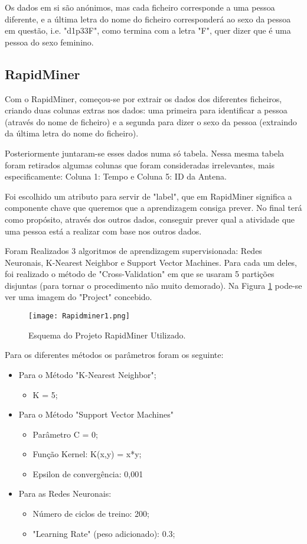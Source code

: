 \documentclass[conference]{IEEEtran}
\begin{document}
Os dados em si são anónimos, mas cada ficheiro corresponde a uma pessoa diferente, e a última letra do nome do ficheiro corresponderá ao sexo da pessoa em questão, i.e. "d1p33F", como termina com a letra "F", quer dizer que é uma pessoa do sexo feminino.

\subsection{RapidMiner}
Com o RapidMiner, começou-se por extrair os dados dos diferentes ficheiros, criando duas colunas extras nos dados: uma primeira para identificar a pessoa (através do nome de ficheiro) e a segunda para dizer o sexo da pessoa (extraindo da última letra do nome do ficheiro).

Posteriormente juntaram-se esses dados numa só tabela. Nessa mesma tabela foram retirados algumas colunas que foram consideradas irrelevantes, mais especificamente: Coluna 1: Tempo e Coluna 5: ID da Antena.

Foi escolhido um atributo para servir de "label", que em RapidMiner significa a componente chave que queremos que a aprendizagem consiga prever. No final terá como propósito, através dos outros dados, conseguir prever qual a atividade que uma pessoa está a realizar com base nos outros dados.

Foram Realizados 3 algoritmos de aprendizagem supervisionada: Redes Neuronais, K-Nearest Neighbor e Support Vector Machines. Para cada um deles, foi realizado o método de "Cross-Validation" em que se usaram 5 partições disjuntas (para tornar o procedimento não muito demorado). Na Figura \ref{fig:rapidminer1} pode-se ver uma imagem do "Project" concebido.

\begin{figure}[H]
	\centering
	\texttt{[image: Rapidminer1.png]}
	\caption{Esquema do Projeto RapidMiner Utilizado.}
	\label{fig:rapidminer1}
\end{figure}

Para os diferentes métodos os parâmetros foram os seguinte:
\begin{itemize}
	\item Para o Método "K-Nearest Neighbor";
	\begin{itemize}
		\item K = 5;
	\end{itemize}
	\item Para o Método "Support Vector Machines"
	\begin{itemize}
		\item Parâmetro C = 0;
		\item Função Kernel: K(x,y) = x*y;
		\item Epsilon de convergência: 0,001
	\end{itemize}
	\item Para as Redes Neuronais:
	\begin{itemize}
		\item Número de ciclos de treino: 200;
		\item "Learning Rate" (peso adicionado): 0.3;
	\end{itemize}
\end{itemize}
\end{document}
